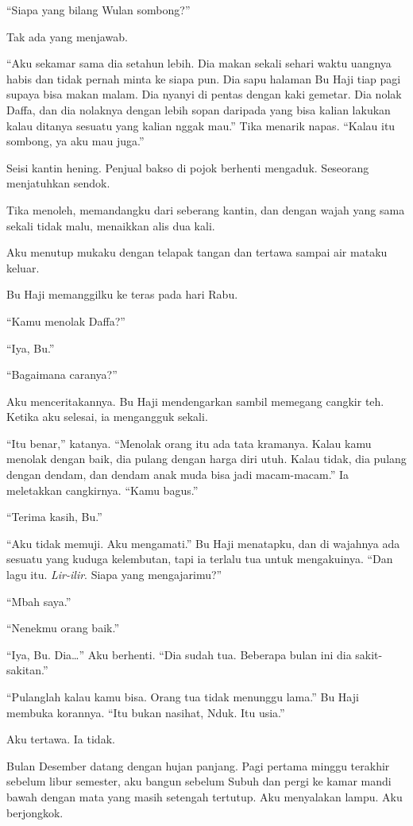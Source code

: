 \documentclass[11pt,twoside,openany]{book}
\makeatletter
\newcommand{\scenebreak}{\par\vspace{0.9em}{\centering\textsc{*\hspace{0.7em}*\hspace{0.7em}*}\par}\vspace{0.9em}\@afterindentfalse\@afterheading}
\makeatother
\begin{document}
``Siapa yang bilang Wulan sombong?''

Tak ada yang menjawab.

``Aku sekamar sama dia setahun lebih. Dia makan sekali sehari waktu uangnya habis dan tidak pernah minta ke siapa pun. Dia sapu halaman Bu Haji tiap pagi supaya bisa makan malam. Dia nyanyi di pentas dengan kaki gemetar. Dia nolak Daffa, dan dia nolaknya dengan lebih sopan daripada yang bisa kalian lakukan kalau ditanya sesuatu yang kalian nggak mau.'' Tika menarik napas. ``Kalau itu sombong, ya aku mau juga.''

Seisi kantin hening. Penjual bakso di pojok berhenti mengaduk. Seseorang menjatuhkan sendok.

Tika menoleh, memandangku dari seberang kantin, dan dengan wajah yang sama sekali tidak malu, menaikkan alis dua kali.

Aku menutup mukaku dengan telapak tangan dan tertawa sampai air mataku keluar.

\scenebreak
Bu Haji memanggilku ke teras pada hari Rabu.

``Kamu menolak Daffa?''

``Iya, Bu.''

``Bagaimana caranya?''

Aku menceritakannya. Bu Haji mendengarkan sambil memegang cangkir teh. Ketika aku selesai, ia mengangguk sekali.

``Itu benar,'' katanya. ``Menolak orang itu ada tata kramanya. Kalau kamu menolak dengan baik, dia pulang dengan harga diri utuh. Kalau tidak, dia pulang dengan dendam, dan dendam anak muda bisa jadi macam-macam.'' Ia meletakkan cangkirnya. ``Kamu bagus.''

``Terima kasih, Bu.''

``Aku tidak memuji. Aku mengamati.'' Bu Haji menatapku, dan di wajahnya ada sesuatu yang kuduga kelembutan, tapi ia terlalu tua untuk mengakuinya. ``Dan lagu itu. \emph{Lir-ilir}. Siapa yang mengajarimu?''

``Mbah saya.''

``Nenekmu orang baik.''

``Iya, Bu. Dia\ldots{}'' Aku berhenti. ``Dia sudah tua. Beberapa bulan ini dia sakit-sakitan.''

``Pulanglah kalau kamu bisa. Orang tua tidak menunggu lama.'' Bu Haji membuka korannya. ``Itu bukan nasihat, Nduk. Itu usia.''

Aku tertawa. Ia tidak.

\scenebreak
Bulan Desember datang dengan hujan panjang. Pagi pertama minggu terakhir sebelum libur semester, aku bangun sebelum Subuh dan pergi ke kamar mandi bawah dengan mata yang masih setengah tertutup. Aku menyalakan lampu. Aku berjongkok.
\end{document}

